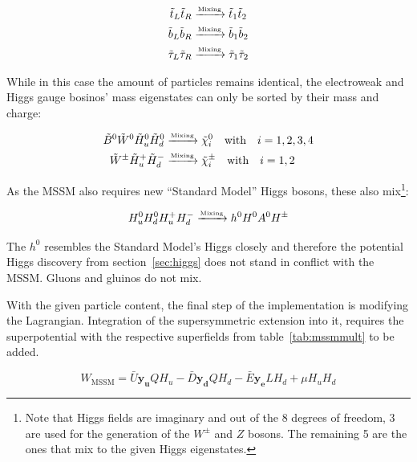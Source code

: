 \begin{align}
  \label{eq:3fammix}
  \tilde{t}_L \tilde{t}_R & \xrightarrow{\text{\tiny{Mixing}}} \tilde{t}_1 \tilde{t}_2 \\
  \tilde{b}_L \tilde{b}_R & \xrightarrow{\text{\tiny{Mixing}}} \tilde{b}_1 \tilde{b}_2 \\
  \tilde{\tau}_L \tilde{\tau}_R & \xrightarrow{\text{\tiny{Mixing}}} \tilde{\tau}_1 \tilde{\tau}_2
\end{align}

\noindent While in this case the amount of particles remains identical, the electroweak and Higgs gauge bosinos' mass eigenstates can only be sorted by their mass and charge:

\begin{align}
  \label{eq:ewhsusymix}
  \tilde{B}^0 \tilde{W}^0 \tilde{H}^0_u \tilde{H}^0_d & \xrightarrow{\text{\tiny{Mixing}}} \tilde{\chi}^0_i \quad \text{with} \quad i = 1,2,3,4 \\
  \tilde{W}^\pm \tilde{H}^+_u \tilde{H}^-_d & \xrightarrow{\text{\tiny{Mixing}}} \tilde{\chi}^\pm_i \quad \text{with} \quad i = 1,2
\end{align}

\noindent As the MSSM also requires new ``Standard Model'' Higgs bosons, these also mix\footnote{Note that Higgs fields are imaginary and out of the 8 degrees of freedom, 3 are used for the generation of the $W^\pm$ and $Z$ bosons. The remaining 5 are the ones that mix to the given Higgs eigenstates.}:

\begin{equation}
  \label{eq:hmix}
  H^0_u H^0_d H^+_u H^-_d \xrightarrow{\text{\tiny{Mixing}}} h^0 H^0 A^0 H^\pm
\end{equation}

\noindent The $h^0$ resembles the Standard Model's Higgs closely and therefore the potential Higgs discovery from section~\ref{sec:higgs} does not stand in conflict with the MSSM. Gluons and gluinos do not mix.

With the given particle content, the final step of the implementation is modifying the Lagrangian. Integration of the supersymmetric extension into it, requires the superpotential with the respective superfields from table~\ref{tab:mssmmult} to be added.

\begin{equation}
  \label{eq:mssmsuperpot}
  W_{\text{MSSM}} = \bar{U} \mathbf{y_u} Q H_u - \bar{D} \mathbf{y_d} Q H_d - \bar{E} \mathbf{y_e} L H_d + \mu H_u H_d
\end{equation}

